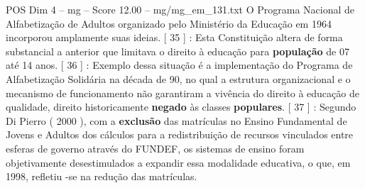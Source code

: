 \begin{textsample}{POS Dim 4 – mg – Score 12.00 – mg/mg\_em\_131.txt}
O Programa Nacional de Alfabetização de Adultos organizado pelo Ministério da Educação em 1964 incorporou amplamente suas ideias. [ 35 ] : Esta Constituição altera de forma substancial a anterior que limitava o direito à educação para \textbf{população} de 07 até 14 anos. [ 36 ] : Exemplo dessa situação é a implementação do Programa de Alfabetização Solidária na década de 90, no qual a estrutura organizacional e o mecanismo de funcionamento não garantiram a vivência do direito à educação de qualidade, direito historicamente \textbf{negado} às classes \textbf{populares}. [ 37 ] : Segundo Di Pierro ( 2000 ), com a \textbf{exclusão} das matrículas no Ensino Fundamental de Jovens e Adultos dos cálculos para a redistribuição de recursos vinculados entre esferas de governo através do FUNDEF, os sistemas de ensino foram objetivamente desestimulados a expandir essa modalidade educativa, o que, em 1998, refletiu -se na redução das matrículas.

\end{textsample}
